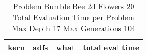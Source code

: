 \begin{table}[H]
\caption{Problem  Bumble Bee 2d  Flowers 20\\Total Evaluation Time per Problem \\ Max Depth 17 Max Generations 104\\}
\begin{center}
\scalebox{1.0} %
{
\begin{tabular}{lllr}
\hline
kern & adfs & what & total eval time \\
\hline


\end{tabular}
}
\end{center}
\end{table}

